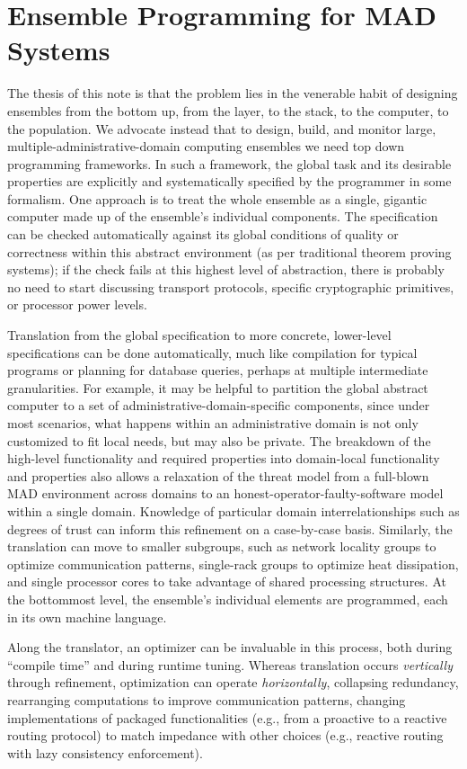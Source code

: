 \documentclass[faircopy]{sig-alternate}
\begin{document}
\section{Ensemble Programming for MAD Systems}

The thesis of this note is that the problem lies in the venerable 
habit of designing ensembles from the bottom up, from the layer, to the
stack, to the computer, to the population. We advocate instead that to
design, build, and monitor large, multiple-administrative-domain computing ensembles we need top
down programming frameworks. In such a framework, the global task and its desirable properties are
explicitly and systematically specified by the programmer in some
formalism. One approach is to treat the whole ensemble as a single,
gigantic computer made up of the ensemble's individual
components.  The specification can be checked automatically against
its global conditions of quality or correctness within this abstract
environment (as per traditional theorem proving systems); if the check
fails at this highest level of abstraction, there is probably no need to
start discussing transport protocols, specific cryptographic primitives,
or processor power levels.

Translation from the global specification to more concrete, lower-level
specifications can be done automatically, much like compilation for
typical programs or planning for database queries, perhaps at multiple
intermediate  granularities.  For example, it may be helpful to
partition the global abstract computer to a set of
administrative-domain-specific components, since under most scenarios,
what happens within an administrative domain is not only customized to
fit local needs, but may also be private. The breakdown of the
high-level functionality and required properties into domain-local
functionality and properties also allows a relaxation of the threat
model from a full-blown MAD environment across domains to an
honest-operator-faulty-software model within a single domain. Knowledge
of particular domain interrelationships such as degrees of trust can
inform this refinement on a case-by-case basis.  Similarly, the
translation can move to smaller subgroups, such as network locality
groups to optimize communication patterns, single-rack groups to
optimize heat dissipation, and single processor cores to take advantage
of shared processing structures. At the bottommost level, the ensemble's
individual elements are programmed, each in its own machine language.

Along the translator, an optimizer can be invaluable in this process,
both during ``compile time'' and during runtime tuning.  Whereas
translation occurs \emph{vertically} through refinement, optimization
can operate \emph{horizontally}, collapsing redundancy, rearranging
computations to improve communication patterns, changing implementations
of packaged functionalities (e.g., from a proactive to a reactive
routing protocol) to match impedance with other choices (e.g., reactive
routing with lazy consistency enforcement).
\end{document}
